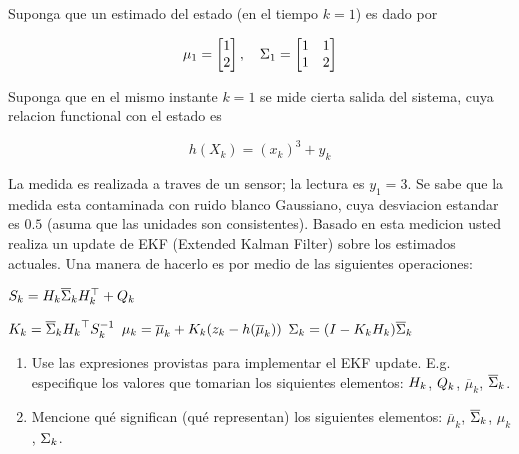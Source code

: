\documentclass[parcial]{lcc}
\begin{document}
Suponga que un estimado del estado (en el tiempo $k = 1$) es dado por

\begin{equation*}
\mu_{1} = \begin{bmatrix} 1 \\ 2 \end{bmatrix}, \quad \Sigma_{1} = \begin{bmatrix} 1 & 1 \\ 1 & 2 \end{bmatrix}    
\end{equation*}

Suponga que en el mismo instante $k=1$ se mide cierta salida del sistema, cuya relacion functional con el estado es

\begin{equation*}
    h\left(X_{k}\right) = \left(x_{k}\right)^3 + y_{k}
\end{equation*}

La medida es realizada a traves de un sensor; la lectura es $y_{1} = 3$. Se sabe que la medida esta contaminada con ruido blanco Gaussiano, cuya desviacion estandar es $0.5$ (asuma que las unidades son consistentes). Basado en esta medicion usted realiza un update de EKF (Extended Kalman Filter) sobre los estimados actuales. Una manera de hacerlo es por medio de las siguientes operaciones:

    \begin{algorithmic}[1]
        \State $S_{k} = H_{k} \overline{\Sigma}_{k} H_{k}^{\top} + Q_{k} $

        \State $K_{k} = \overline{\Sigma}_{k} {H_{k}}^{\top} S_{k}^{-1} $
        \State $\mu_{k} = \overline{\mu}_{k} + K_{k}(z_{k} - h(\overline{\mu}_{k}))$
        \State $\Sigma_{k} = (I - K_{k}H_{k})\overline{\Sigma}_{k}$
    \end{algorithmic}

    \begin{enumerate}
        \item Use las expresiones provistas para implementar el EKF update. E.g. especifique los valores que tomarian los siquientes elementos: $H_{k}$, $Q_{k}$, $\overline{\mu}_{k}$, $\overline{\Sigma}_{k}$.
        \item Mencione qué significan (qué representan) los siguientes elementos: $\overline{\mu}_{k}$, $\overline{\Sigma}_{k}$, $\mu_{k}$, $\Sigma_{k}$.
    \end{enumerate}
\end{document}
